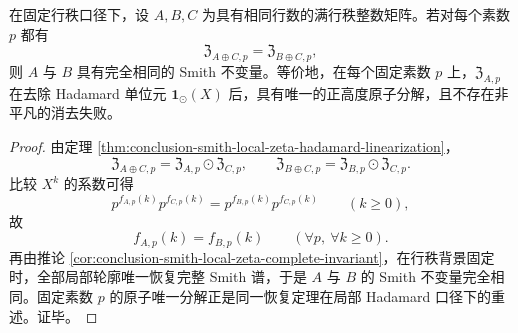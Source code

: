 \begin{corollary}\label{cor:conclusion-smith-local-zeta-directsum-cancellation}
在固定行秩口径下，设 \(A,B,C\) 为具有相同行数的满行秩整数矩阵。若对每个素数 \(p\) 都有
\[
\mathfrak Z_{A\oplus C,p}=\mathfrak Z_{B\oplus C,p},
\]
则 \(A\) 与 \(B\) 具有完全相同的 Smith 不变量。等价地，在每个固定素数 \(p\) 上，\(\mathfrak Z_{A,p}\) 在去除 Hadamard 单位元 \(\mathbf 1_{\odot}(X)\) 后，具有唯一的正高度原子分解，且不存在非平凡的消去失败。
\end{corollary}
\begin{proof}
由定理 \ref{thm:conclusion-smith-local-zeta-hadamard-linearization}，
\[
\mathfrak Z_{A\oplus C,p}
=
\mathfrak Z_{A,p}\odot \mathfrak Z_{C,p},
\qquad
\mathfrak Z_{B\oplus C,p}
=
\mathfrak Z_{B,p}\odot \mathfrak Z_{C,p}.
\]
比较 \(X^k\) 的系数可得
\[
p^{f_{A,p}(k)}p^{f_{C,p}(k)}
=
p^{f_{B,p}(k)}p^{f_{C,p}(k)}
\qquad(k\ge 0),
\]
故
\[
f_{A,p}(k)=f_{B,p}(k)
\qquad(\forall p,\ \forall k\ge 0).
\]
再由推论 \ref{cor:conclusion-smith-local-zeta-complete-invariant}，在行秩背景固定时，全部局部轮廓唯一恢复完整 Smith 谱，于是 \(A\) 与 \(B\) 的 Smith 不变量完全相同。固定素数 \(p\) 的原子唯一分解正是同一恢复定理在局部 Hadamard 口径下的重述。证毕。
\end{proof}

